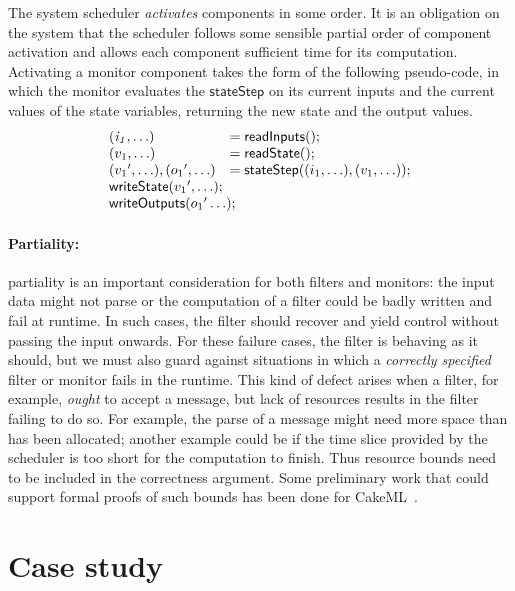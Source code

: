 \documentclass[global,twocolumn]{svjour}
\newcommand{\konst}[1]{\ensuremath{\mathsf{#1}}}
\newcommand{\ckml}{CakeML}
\begin{document}
The system scheduler \emph{activates} components in some order.
%
It is an obligation on the system that the scheduler follows some sensible partial order of component activation and allows each component sufficient time for its computation.
%
Activating a monitor component takes the form of the following pseudo-code, in which the monitor evaluates the \konst{stateStep} on its current inputs and the current values of the state variables, returning the new state and the output values.
%
\[
\begin{array}{ll}
 \mathit{(i_1,\ldots)} & = \konst{readInputs}(); \\
 (v_1,\ldots) & = \konst{readState}() ; \\
 ({v_1}',\ldots), ({o_1}',\ldots) & = \konst{stateStep} ((i_1,\ldots),(v_1,\ldots)) ; \\
 \multicolumn{2}{l}{\konst{writeState}({v_1}',\ldots);} \\
 \multicolumn{2}{l}{\konst{writeOutputs}({o_1}'\ldots);} \\
\end{array}
\]


\paragraph{Partiality:\/} partiality is an important consideration for both filters and monitors: the input data might not parse or the computation of a filter could be badly written and fail at runtime.
%
In such cases, the filter should recover and yield control without passing the input onwards.
%
For these failure cases, the filter is behaving as it should, but we must also guard against situations in which a \emph{correctly specified} filter or monitor fails in the runtime.
%
This kind of defect arises when a filter, for example, \emph{ought} to accept a message, but lack of resources results in the filter failing to do so.
%
For example, the parse of a message might need more space than has been allocated;
%
another example could be if the time slice provided by the scheduler is too short for the computation to finish.
%
Thus resource bounds need to be included in the correctness argument.
%
Some preliminary work that could support formal proofs of such bounds has been done for \ckml\ \cite{cakeml-space-cost}.


\section{Case study}
\label{sec:case-study}
\end{document}

